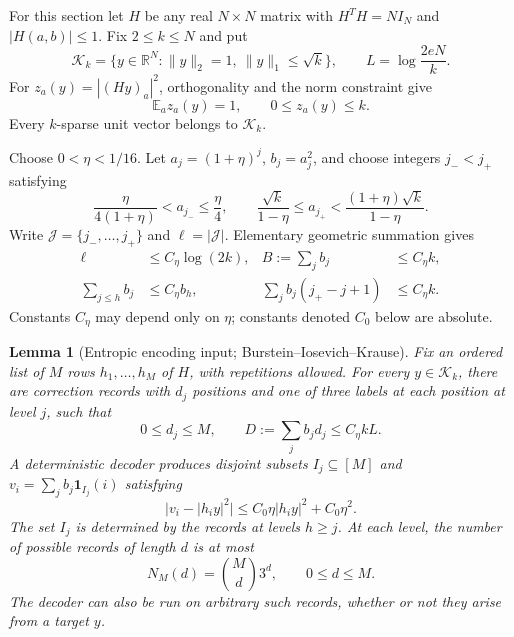 \documentclass[11pt]{article}
\newtheorem{lemma}[theorem]{Lemma}
\theoremstyle{remark}
\newcommand{\E}{\mathbb E}
\newcommand{\R}{\mathbb R}
\newcommand{\1}{\mathbf 1}
\newcommand{\K}{\mathcal K}
\begin{document}
For this section let $H$ be any real $N\times N$ matrix with
$H^TH=NI_N$ and $|H(a,b)|\leq1$. Fix $2\leq k\leq N$ and put
\begin{equation}\label{eq:class}
 \K_k=\{y\in\R^N:\|y\|_2=1,\ \|y\|_1\leq\sqrt k\},
 \qquad L=\log\frac{2eN}{k}.
\end{equation}
For $z_a(y)=|(Hy)_a|^2$, orthogonality and the norm constraint give
\begin{equation}\label{eq:energyfacts}
 \E_a z_a(y)=1,\qquad 0\leq z_a(y)\leq k.
\end{equation}
Every $k$-sparse unit vector belongs to $\K_k$.

Choose $0<\eta<1/16$. Let $a_j=(1+\eta)^j$, $b_j=a_j^2$, and choose
integers $j_-<j_+$ satisfying
\[
 \frac{\eta}{4(1+\eta)}<a_{j_-}\leq\frac\eta4,
 \qquad
 \frac{\sqrt k}{1-\eta}\leq a_{j_+}
 <\frac{(1+\eta)\sqrt k}{1-\eta}.
\]
Write $\mathcal J=\{j_-,\ldots,j_+\}$ and $\ell=|\mathcal J|$.
Elementary geometric summation gives
\begin{align}
 \ell&\leq C_\eta\log(2k),&
 B:=\sum_j b_j&\leq C_\eta k,\label{eq:geometry1}\\
 \sum_{j\leq h}b_j&\leq C_\eta b_h,&
 \sum_j b_j(j_+-j+1)&\leq C_\eta k.\label{eq:geometry2}
\end{align}
Constants $C_\eta$ may depend only on $\eta$; constants denoted $C_0$
below are absolute.

\begin{lemma}[Entropic encoding input; Burstein--Iosevich--Krause]
\label{lem:encoding}
Fix an ordered list of $M$ rows $h_1,\ldots,h_M$ of $H$, with repetitions
allowed. For every $y\in\K_k$, there are correction records with $d_j$
positions and one of three labels at each position at level $j$, such that
\begin{equation}\label{eq:cost}
 0\leq d_j\leq M,\qquad D:=\sum_j b_jd_j\leq C_\eta kL.
\end{equation}
A deterministic decoder produces disjoint subsets $I_j\subseteq[M]$ and
$v_i=\sum_j b_j\1_{I_j}(i)$ satisfying
\begin{equation}\label{eq:approx}
 \big|v_i-|h_i y|^2\big|
 \leq C_0\eta |h_i y|^2+C_0\eta^2.
\end{equation}
The set $I_j$ is determined by the records at levels $h\geq j$.
At each level, the number of possible records of length $d$ is at most
\begin{equation}\label{eq:recordnumber}
 N_M(d)=\binom Md3^d,\qquad 0\leq d\leq M.
\end{equation}
The decoder can also be run on arbitrary such records, whether or not
they arise from a target $y$.
\end{lemma}
\end{document}
